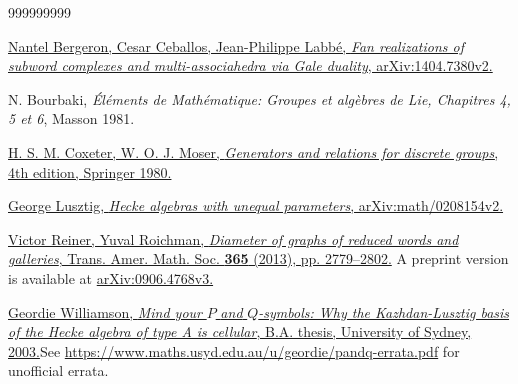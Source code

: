 \documentclass
[numbers=enddot,12pt,final,onecolumn,notitlepage,abstracton]{scrartcl}%
\theoremstyle{definition}
\begin{document}
\begin{thebibliography}{999999999}                                                                                        %


\href{http://arxiv.org/abs/1404.7380v2}{Nantel
Bergeron, Cesar Ceballos, Jean-Philippe Labb\'{e}, \textit{Fan realizations of
subword complexes and multi-associahedra via Gale duality},
arXiv:1404.7380v2.}

N. Bourbaki, \textit{\'{E}l\'{e}ments de
Math\'{e}matique: Groupes et alg\`{e}bres de Lie, Chapitres 4, 5 et 6}, Masson 1981.

%
\href{https://doi.org/10.1007/978-3-662-21943-0}{H. S. M. Coxeter, W. O. J.
Moser, \textit{Generators and relations for discrete groups}, 4th edition,
Springer 1980.}

%
\href{http://arxiv.org/abs/math/0208154v2}{George Lusztig, \textit{Hecke
algebras with unequal parameters}, arXiv:math/0208154v2.}

%
\href{http://www.ams.org/journals/tran/2013-365-05/S0002-9947-2012-05719-9/S0002-9947-2012-05719-9.pdf}{Victor
Reiner, Yuval Roichman, \textit{Diameter of graphs of reduced words and
galleries}, Trans. Amer. Math. Soc. \textbf{365} (2013), pp. 2779--2802.}%
\newline A preprint version is available at
\href{http://arxiv.org/abs/0906.4768v3}{arXiv:0906.4768v3.}

%
\href{https://web.archive.org/web/20250801094939/https://people.mpim-bonn.mpg.de/geordie/Hecke.pdf}{Geordie
Williamson, \textit{Mind your }$P$\textit{ and }$Q$\textit{-symbols: Why the
Kazhdan-Lusztig basis of the Hecke algebra of type A is cellular}, B.A.
thesis, University of Sydney, 2003.}\newline See
\url{https://www.maths.usyd.edu.au/u/geordie/pandq-errata.pdf} for unofficial errata.
\end{thebibliography}
\end{document}
